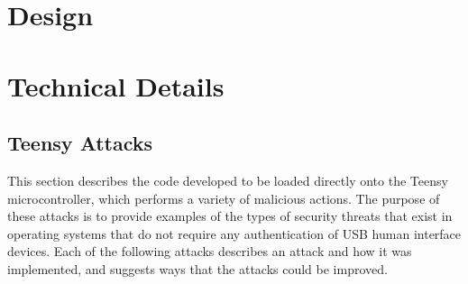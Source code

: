 \documentclass[pagenumbers]{ieee}
\begin{document}
\section{Design}
\label{section:design}


\section{Technical Details}
\label{section:technical}


\subsection{Teensy Attacks}
\label{section:teensy}

This section describes the code developed to be loaded directly onto the Teensy microcontroller, which performs a variety of malicious actions. The purpose of these attacks is to provide examples of the types of security threats that exist in operating systems that do not require any authentication of USB human interface devices. Each of the following attacks describes an attack and how it was implemented, and suggests ways that the attacks could be improved.
\end{document}
